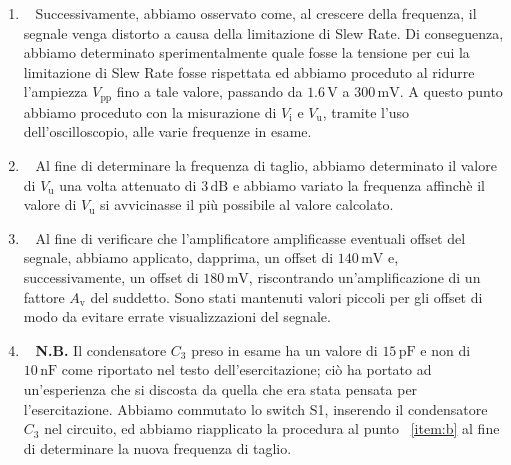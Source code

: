 \documentclass[a4paper]{article}
\begin{document}
			\begin{enumerate}[label=\alph*.]
				\item \ 
					\newline
					Successivamente, abbiamo osservato come, al crescere della frequenza, il segnale venga distorto a causa della limitazione di Slew Rate.
					\newline
					Di conseguenza, abbiamo determinato sperimentalmente quale fosse la tensione per cui la limitazione di Slew Rate fosse rispettata ed abbiamo proceduto al ridurre l'ampiezza $ V_{\mathrm{pp}} $ fino a tale valore, passando da $ 1.6 \, \mathrm{V} $ a $ 300 \, \mathrm{mV} $.
					\newline
					A questo punto abbiamo proceduto con la misurazione di $ V_{\mathrm{i}} $ e $ V_{\mathrm{u}} $, tramite l'uso dell'oscilloscopio, alle varie frequenze in esame.
				\item \label{item:b} \ 
					\newline
					Al fine di determinare la frequenza di taglio, abbiamo determinato il valore di $ V_{\mathrm{u}} $ una volta attenuato di $ 3 \, \mathrm{dB} $ e abbiamo variato la frequenza affinchè il valore di $ V_{\mathrm{u}} $ si avvicinasse il più possibile al valore calcolato.
				\item \ 
					\newline
					Al fine di verificare che l'amplificatore amplificasse eventuali offset del segnale, abbiamo applicato, dapprima, un offset di $ 140 \, \mathrm{mV} $ e, successivamente, un offset di $ 180 \, \mathrm{mV} $, riscontrando un'amplificazione di un fattore $ A_{\mathrm{v}} $ del suddetto.
					\newline
					Sono stati mantenuti valori piccoli per gli offset di modo da evitare errate visualizzazioni del segnale.
				\item \ 
					\newline
					\textbf{N.B.} Il condensatore $ C_{3} $ preso in esame ha un valore di $ 15 \, \mathrm{pF} $ e non di $ 10 \, \mathrm{nF} $ come riportato nel testo dell'esercitazione; ciò ha portato ad un'esperienza che si discosta da quella che era stata pensata per l'esercitazione.
					\newline
					\newline
					Abbiamo commutato lo switch S1, inserendo il condensatore $ C_{3} $ nel circuito, ed abbiamo riapplicato la procedura al punto ~\ref{item:b} al fine di determinare la nuova frequenza di taglio.
					\newline

\end{enumerate}
\end{document}
